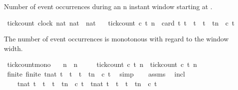 \begin{isabellebody}
%
\endisatagproof
{\isafoldproof}%
%
\isadelimproof
%
\endisadelimproof
%
\begin{isamarkuptext}%
Number of event occurrences during an n instant window starting at .%
\end{isamarkuptext}\isamarkuptrue%
\isamarkupfalse%
\ tick{\isacharunderscore}count\ {\isacharcolon}{\isacharcolon}{\isacartoucheopen}{\isacharbrackleft}clock{\isacharcomma}\ nat{\isacharcomma}\ nat{\isacharbrackright}\ {\isasymRightarrow}\ nat{\isacartoucheclose}\isanewline
\ \ \ {\isacartoucheopen}tick{\isacharunderscore}count\ c\ t\ n\ {\isasymequiv}\ card\ {\isacharbraceleft}t{\isachardot}\ t\ {\isasymle}\ t\ {\isasymand}\ t\ {\isacharless}\ tn\ {\isasymand}\ c\ t{\isacharbraceright}{\isacartoucheclose}%
\begin{isamarkuptext}%
The number of event occurrences is monotonous with regard to the window width.%
\end{isamarkuptext}\isamarkuptrue%
\isamarkupfalse%
\ tick{\isacharunderscore}count{\isacharunderscore}mono{\isacharcolon}\isanewline
\ \ \ {\isacartoucheopen}n{\isacharprime}\ {\isasymge}\ n{\isacartoucheclose}\isanewline
\ \ \ \ \ {\isacartoucheopen}tick{\isacharunderscore}count\ c\ t\ n{\isacharprime}\ {\isasymge}\ tick{\isacharunderscore}count\ c\ t\ n{\isacartoucheclose}\isanewline
%
\isadelimproof
%
\endisadelimproof
%
\isatagproof
{}\isamarkupfalse%
\ {\isacharminus}\isanewline
\ \ \isamarkupfalse%
\ finite{\isacharcolon}\ {\isacartoucheopen}finite\ {\isacharbraceleft}t{\isacharcolon}{\isacharcolon}nat{\isachardot}\ t\ {\isasymle}\ t\ {\isasymand}\ t\ {\isacharless}\ tn{\isacharprime}\ {\isasymand}\ c\ t{\isacharbraceright}{\isacartoucheclose}\ \isamarkupfalse%
\ simp\isanewline
\ \ \isamarkupfalse%
\ assms\ \isamarkupfalse%
\ incl{\isacharcolon}\isanewline
\ \ \ \ {\isacartoucheopen}{\isacharbraceleft}t{\isacharcolon}{\isacharcolon}nat{\isachardot}\ t\ {\isasymle}\ t\ {\isasymand}\ t\ {\isacharless}\ tn\ {\isasymand}\ c\ t{\isacharbraceright}\ {\isasymsubseteq}\ {\isacharbraceleft}t{\isacharcolon}{\isacharcolon}nat{\isachardot}\ t\ {\isasymle}\ t\ {\isasymand}\ t\ {\isacharless}\ tn{\isacharprime}\ {\isasymand}\ c\ t{\isacharbraceright}{\isacartoucheclose}\ \isamarkupfalse%

\end{isabellebody}
